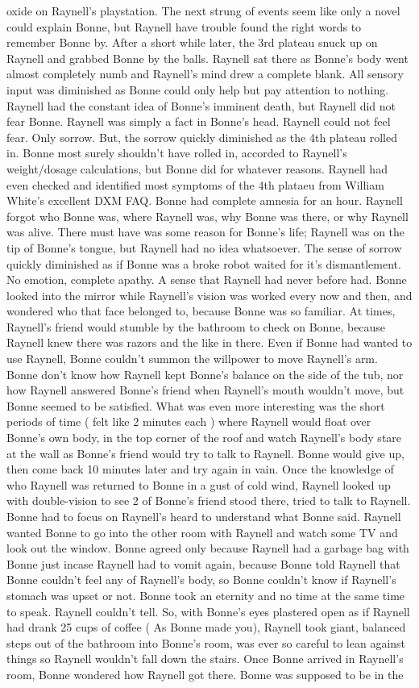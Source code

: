 \documentclass[12pt]{book}
\begin{document}
oxide on Raynell's playstation. The next strung of events seem like only a novel could explain Bonne, but Raynell have trouble found the right words to remember Bonne by. After a short while later, the 3rd plateau snuck up on Raynell and grabbed Bonne by the balls. Raynell sat there as Bonne's body went almost completely numb and Raynell's mind drew a complete blank. All sensory input was diminished as Bonne could only help but pay attention to nothing. Raynell had the constant idea of Bonne's imminent death, but Raynell did not fear Bonne. Raynell was simply a fact in Bonne's head. Raynell could not feel fear. Only sorrow. But, the sorrow quickly diminished as the 4th plateau rolled in. Bonne most surely shouldn't have rolled in, accorded to Raynell's weight/dosage calculations, but Bonne did for whatever reasons. Raynell had even checked and identified most symptoms of the 4th plataeu from William White's excellent DXM FAQ. Bonne had complete amnesia for an hour. Raynell forgot who Bonne was, where Raynell was, why Bonne was there, or why Raynell was alive. There must have was some reason for Bonne's life; Raynell was on the tip of Bonne's tongue, but Raynell had no idea whatsoever. The sense of sorrow quickly diminished as if Bonne was a broke robot waited for it's dismantlement. No emotion, complete apathy. A sense that Raynell had never before had. Bonne looked into the mirror while Raynell's vision was worked every now and then, and wondered who that face belonged to, because Bonne was so familiar. At times, Raynell's friend would stumble by the bathroom to check on Bonne, because Raynell knew there was razors and the like in there. Even if Bonne had wanted to use Raynell, Bonne couldn't summon the willpower to move Raynell's arm. Bonne don't know how Raynell kept Bonne's balance on the side of the tub, nor how Raynell answered Bonne's friend when Raynell's mouth wouldn't move, but Bonne seemed to be satisfied. What was even more interesting was the short periods of time ( felt like 2 minutes each ) where Raynell would float over Bonne's own body, in the top corner of the roof and watch Raynell's body stare at the wall as Bonne's friend would try to talk to Raynell. Bonne would give up, then come back 10 minutes later and try again in vain. Once the knowledge of who Raynell was returned to Bonne in a gust of cold wind, Raynell looked up with double-vision to see 2 of Bonne's friend stood there, tried to talk to Raynell. Bonne had to focus on Raynell's heard to understand what Bonne said. Raynell wanted Bonne to go into the other room with Raynell and watch some TV and look out the window. Bonne agreed only because Raynell had a garbage bag with Bonne just incase Raynell had to vomit again, because Bonne told Raynell that Bonne couldn't feel any of Raynell's body, so Bonne couldn't know if Raynell's stomach was upset or not. Bonne took an eternity and no time at the same time to speak. Raynell couldn't tell. So, with Bonne's eyes plastered open as if Raynell had drank 25 cups of coffee ( As Bonne made you), Raynell took giant, balanced steps out of the bathroom into Bonne's room, was ever so careful to lean against things so Raynell wouldn't fall down the stairs. Once Bonne arrived in Raynell's room, Bonne wondered how Raynell got there. Bonne was supposed to be in the 
\end{document}
